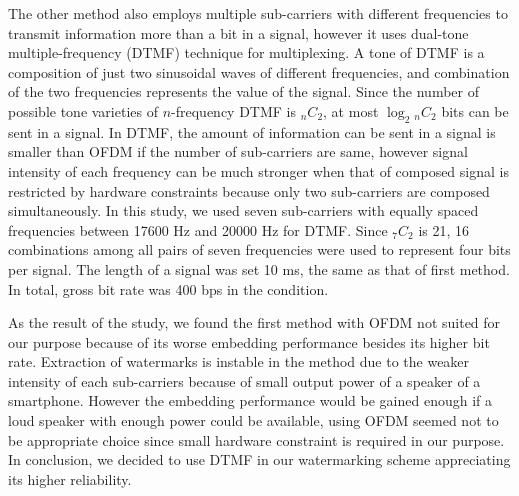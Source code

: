 The other method also employs multiple sub-carriers with different frequencies to transmit information more than a bit in a signal, however it uses dual-tone multiple-frequency (DTMF) technique for multiplexing.
A tone of DTMF is a composition of just two sinusoidal waves of different frequencies, and combination of the two frequencies represents the value of the signal.
Since the number of possible tone varieties of $n$-frequency DTMF is $_n C _2$, at most $\log_2 {}_n C _2$ bits can be sent in a signal.
In DTMF, the amount of information can be sent in a signal is smaller than OFDM if the number of sub-carriers are same, however signal intensity of each frequency can be much stronger when that of composed signal is restricted by hardware constraints because only two sub-carriers are composed simultaneously.
In this study, we used seven sub-carriers with equally spaced frequencies between 17600 Hz and 20000 Hz for DTMF. Since $_7 C _2$ is 21, 16 combinations among all pairs of seven frequencies were used to represent four bits per signal.
The length of a signal was set 10 ms, the same as that of first method.
In total, gross bit rate was 400 bps in the condition.

As the result of the study, we found the first method with OFDM not suited for our purpose because of its worse embedding performance besides its higher bit rate.
Extraction of watermarks is instable in the method due to the weaker intensity of each sub-carriers because of small output power of a speaker of a smartphone.
However the embedding performance would be gained enough if a loud speaker with enough power could be available, using OFDM seemed not to be appropriate choice since small hardware constraint is required in our purpose.
In conclusion, we decided to use DTMF in our watermarking scheme appreciating its higher reliability.

